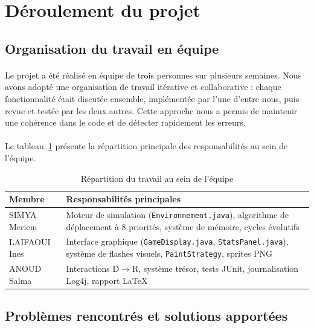 \section{Déroulement du projet}
\label{sec:deroul}

\subsection{Organisation du travail en équipe}

\paragraph{} Le projet a été réalisé en équipe de trois personnes sur plusieurs semaines. Nous avons adopté une organisation de travail itérative et collaborative : chaque fonctionnalité était discutée ensemble, implémentée par l'une d'entre nous, puis revue et testée par les deux autres. Cette approche nous a permis de maintenir une cohérence dans le code et de détecter rapidement les erreurs.

\paragraph{} Le tableau~\ref{tab:repartition} présente la répartition principale des responsabilités au sein de l'équipe.

\begin{table}[h!]
\centering
\renewcommand{\arraystretch}{1.4}
\begin{tabular}{|l|p{9cm}|}
\hline
\textbf{Membre} & \textbf{Responsabilités principales} \\
\hline
SIMYA Meriem & Moteur de simulation (\texttt{Environnement.java}), algorithme de déplacement à 8 priorités, système de mémoire, cycles évolutifs \\
\hline
LAIFAOUI Ines & Interface graphique (\texttt{GameDisplay.java}, \texttt{StatsPanel.java}), système de flashes visuels, \texttt{PaintStrategy}, sprites PNG \\
\hline
ANOUD Salma & Interactions D$\rightarrow$R, système trésor, tests JUnit, journalisation Log4j, rapport \LaTeX \\
\hline
\end{tabular}
\caption{Répartition du travail au sein de l'équipe}
\label{tab:repartition}
\end{table}

\bigskip

\subsection{Problèmes rencontrés et solutions apportées}

